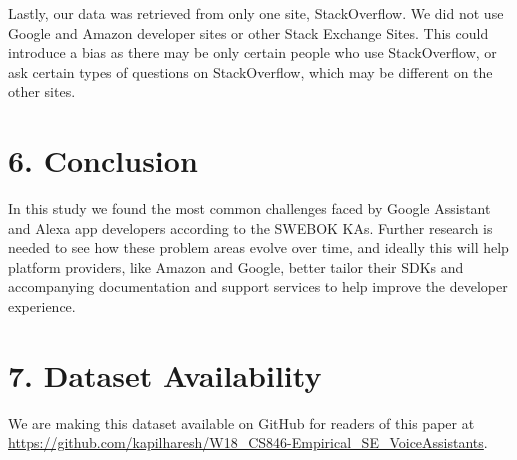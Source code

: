 \documentclass{sigchi}
\begin{document}
Lastly, our data was retrieved from only one site, StackOverflow. We did not use Google and Amazon developer sites or other Stack Exchange Sites. This could introduce a bias as there may be only certain people who use StackOverflow, or ask certain types of questions on StackOverflow, which may be different on the other sites.
\section{6. Conclusion}
In this study we found the most common challenges faced by Google Assistant and Alexa app developers according to the SWEBOK KAs. Further research is needed to see how these problem areas evolve over time, and ideally this will help platform providers, like Amazon and Google, better tailor their SDKs and accompanying documentation and support services to help improve the developer experience.
\section{7. Dataset Availability}
We are making this dataset available on GitHub for readers of this paper at \url{https://github.com/kapilharesh/W18_CS846-Empirical_SE_VoiceAssistants}.
{\footnotesize 
}
\pagebreak
\onecolumn %
\end{document}
